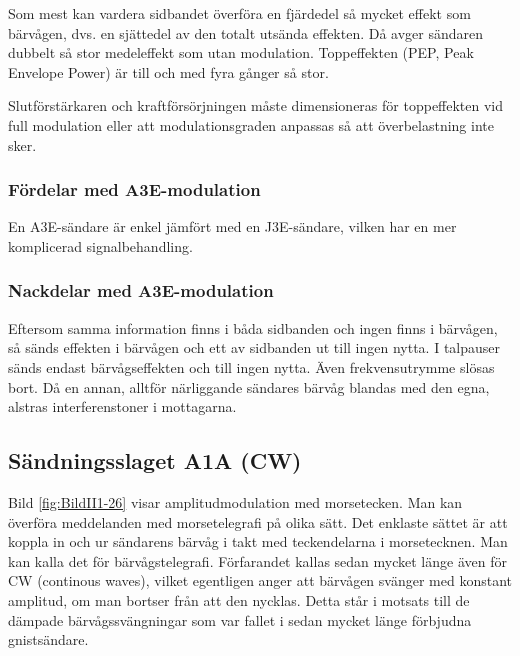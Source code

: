 Som mest kan vardera sidbandet överföra en fjärdedel så mycket effekt som
bärvågen, dvs. en sjättedel av den totalt utsända effekten.
Då avger sändaren dubbelt så stor medeleffekt som utan modulation.
Toppeffekten (PEP, Peak Envelope Power) är till och med fyra gånger så stor.

Slutförstärkaren och kraftförsörjningen måste dimensioneras för toppeffekten vid
full modulation eller att modulationsgraden anpassas så att överbelastning inte
sker.

\subsubsection{Fördelar med A3E-modulation}

En A3E-sändare är enkel jämfört med en J3E-sändare, vilken har en mer
komplicerad signalbehandling.


\subsubsection{Nackdelar med A3E-modulation}

Eftersom samma information finns i båda sidbanden och ingen finns i bärvågen,
så sänds effekten i bärvågen och ett av sidbanden ut till ingen nytta.
I talpauser sänds endast bärvågseffekten och till ingen nytta.
Även frekvensutrymme slösas bort.
Då en annan, alltför närliggande sändares bärvåg blandas med den egna,
alstras interferenstoner i mottagarna.


\subsection{Sändningsslaget A1A (CW)}
\label{modulation_cw}


Bild \ref{fig:BildII1-26} visar amplitudmodulation med morsetecken.
Man kan överföra meddelanden med morsetelegrafi på olika sätt.
Det enklaste sättet är att koppla in och ur sändarens bärvåg i takt med
teckendelarna i morsetecknen.
Man kan kalla det för bärvågstelegrafi.
Förfarandet kallas sedan mycket länge även för CW (continous waves), vilket
egentligen anger att bärvågen svänger med konstant amplitud, om man bortser
från att den nycklas.
Detta står i motsats till de dämpade bärvågssvängningar som var fallet i sedan
mycket länge förbjudna gnistsändare.

